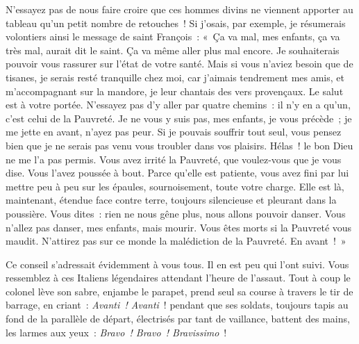 \documentclass[french,twoside]{book} %
\newcommand{\astertri}{\medskip\par\centerline{\color{rubric}\large\selectfont{\syms ✻\,✻\,✻}}\medskip\par}%
\begin{document}
N’essayez pas de nous faire croire que ces hommes divins ne viennent apporter au tableau qu’un petit nombre de retouches ! Si j’osais, par exemple, je résumerais volontiers ainsi le message de saint François : « Ça va mal, mes enfants, ça va très mal, aurait dit le saint. Ça va même aller plus mal encore. Je souhaiterais pouvoir vous rassurer sur l’état de votre santé. Mais si vous n’aviez besoin que de tisanes, je serais resté tranquille chez moi, car j’aimais tendrement mes amis, et m’accompagnant sur la mandore, je leur chantais des vers provençaux. Le salut est à votre portée. N’essayez pas d’y aller par quatre chemins : il n’y en a qu’un, c’est celui de la Pauvreté. Je ne vous y suis pas, mes enfants, je vous précède ; je me jette en avant, n’ayez pas peur. Si je pouvais souffrir tout seul, vous pensez bien que je ne serais pas venu vous troubler dans vos plaisirs. Hélas ! le bon Dieu ne me l’a pas permis. Vous avez irrité la Pauvreté, que voulez-vous que je vous dise. Vous l’avez poussée à bout. Parce qu’elle est patiente, vous avez fini par lui mettre peu à peu sur les épaules, sournoisement, toute votre charge. Elle est là, maintenant, étendue face contre terre, toujours silencieuse et pleurant dans la poussière. Vous dites : rien ne nous gêne plus, nous allons pouvoir danser. Vous n’allez pas danser, mes enfants, mais mourir. Vous êtes morts si la Pauvreté vous maudit. N’attirez pas sur ce monde la malédiction de la Pauvreté. En avant ! »\par
Ce conseil s’adressait évidemment à vous tous. Il en est peu qui l’ont suivi. Vous ressemblez à ces Italiens légendaires attendant l’heure de l’assaut. Tout à coup le colonel lève son sabre, enjambe le parapet, prend seul sa course à travers le tir de barrage, en criant : \emph{Avanti ! Avanti} ! pendant que ses soldats, toujours tapis au fond de la parallèle de départ, électrisés par tant de vaillance, battent des mains, les larmes aux yeux : \emph{Bravo ! Bravo ! Bravissimo} !\par
 \par

\astertri
\end{document}
